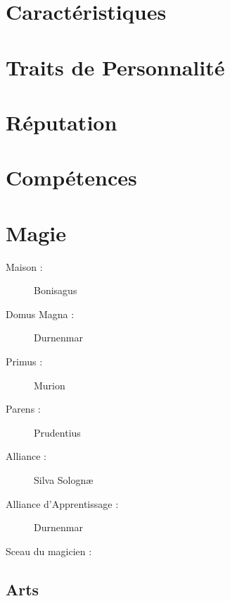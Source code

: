 \section*{Caractéristiques}


\caractableMP

\begin{multicols*}{2}

\longVFQs

\section*{Traits de Personnalité}

\traitslong

\section*{Réputation}

\reputationslong



\section*{Compétences}

\abilitieslong

\end{multicols*}

\pagebreak

\section*{Magie}
\begin{multicols}{2}
\begin{description}
\item[Maison :] Bonisagus
\item[Domus Magna :] Durnenmar
\item[Primus :] Murion
\item[Parens :] Prudentius
\item[Alliance :] Silva Solognæ
\item[Alliance d'Apprentissage :] Durnenmar
\item[Sceau du magicien :] \magussigil
\end{description}
\end{multicols}
\subsection*{Arts}

